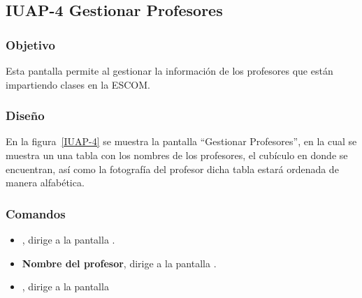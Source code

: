 \subsection{IUAP-4  Gestionar  Profesores}

\subsubsection{Objetivo}

	
    Esta pantalla permite al   gestionar la información de los profesores que están impartiendo clases en la ESCOM.
\subsubsection{Diseño}


    En la figura~\ref{IUAP-4} se muestra la pantalla ``Gestionar Profesores'', en la cual se muestra un una tabla con los nombres de los profesores, el cubículo en donde se encuentran, así como la fotografía del profesor dicha tabla estará ordenada de manera alfabética.



\subsubsection{Comandos}
    \begin{itemize}
	\item {}, dirige a la pantalla .
	\item \textbf{Nombre del profesor}, dirige a la pantalla .
	\item {}, dirige a la pantalla 
    \end{itemize}
